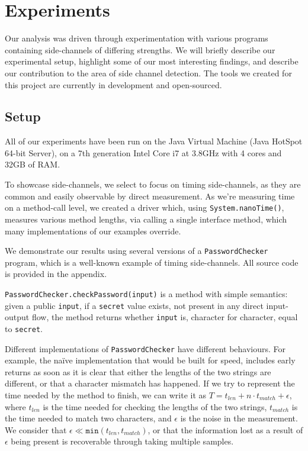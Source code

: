 \section{Experiments}

Our analysis was driven through experimentation with various programs containing side-channels of differing strengths. We will briefly describe our experimental setup, highlight some of our most interesting findings, and describe our contribution to the area of side channel detection. The tools we created for this
project are currently in development and open-sourced. 


\subsection{Setup}

All of our experiments have been run on the Java Virtual Machine (Java HotSpot 
64-bit Server), on a 7th generation Intel Core i7 at 3.8GHz with 4 cores and 32GB of RAM.

To showcase side-channels, we select to focus on timing side-channels, as they are common
and easily observable by direct measurement. As we're measuring time on a method-call level, 
we created a driver which, using \texttt{System.nanoTime()}, measures various method lengths,
via calling a single interface method, which many implementations of our examples override. 

We demonstrate our results using several versions of a \texttt{PasswordChecker} program, 
which is a well-known example of timing side-channels. All source code is provided in the appendix.

\texttt{PasswordChecker.checkPassword(input)} is a method with simple semantics: given a public 
\texttt{input}, if a \texttt{secret} value exists, not present in any direct input-output flow, the 
method returns whether \texttt{input} is, character for character, equal to \texttt{secret}.

Different implementations of \texttt{PasswordChecker} have different behaviours. For example,
the na\"ive implementation that would be built for speed, includes early returns as soon as
it is clear that either the lengths of the two strings are different, or that a character
mismatch has happened. If we try to represent the time needed by the method
to finish, we can write it as $T = t_{len} + n\cdot t_{match} + \epsilon$, where $t_{len}$ is the time needed for
checking the lengths of the two strings, $t_{match}$ is the time needed to match two characters, and $\epsilon$ is the noise in the measurement. We consider that $\epsilon \ll \texttt{min}(t_{len}, t_{match})$, or that the information lost as a result of $\epsilon$ being present is recoverable through taking multiple samples.

